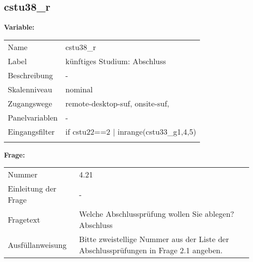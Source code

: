 	
	
	\subsection{cstu38\_r}
	\label{subSection:cstu38_r}

	\noindent\textbf{Variable:}\\
		\begin{tabular}{lL{11.3cm}}
			\label{tableVariable:cstu38_r}
			Name & cstu38\_r \\
			Label & künftiges Studium: Abschluss \\
			Beschreibung & - \\
			Skalenniveau & nominal \\
			Zugangswege &
				remote-desktop-suf,
				onsite-suf,
 \\
			Panelvariablen & -
			 \\
			Eingangsfilter & if cstu22==2 | inrange(cstu33\_g1,4,5) \\
 \\
		\end{tabular}

		\vspace*{1 cm}
		\noindent\textbf{Frage:}\\
		\begin{tabular}{lL{11.3cm}}
			\label{tableQuestion:cstu38_r}
			Nummer & 4.21 \\
			Einleitung der Frage & - \\
			Fragetext & Welche Abschlussprüfung wollen Sie ablegen?
Abschluss \\
			Ausfüllanweisung & Bitte zweistellige Nummer aus der Liste der Abschlussprüfungen in Frage 2.1 angeben. \\
		\end{tabular}





